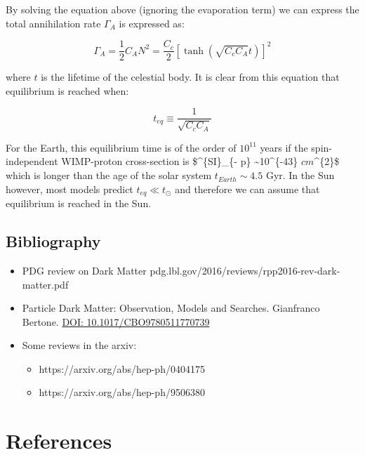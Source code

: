 \documentclass[
  letterpaper,
  DIV=11,
  numbers=noendperiod]{scrreprt}
\providecommand{\tightlist}{%
  \setlength{\itemsep}{0pt}\setlength{\parskip}{0pt}}\usepackage{longtable,booktabs,array}
\begin{document}
By solving the equation above (ignoring the evaporation term) we can
express the total annihilation rate \(\Gamma_A\) is expressed as:

\[\Gamma_A = \frac{1}{2}C_A N^2 = \frac{C_c}{2}\left[\tanh(\sqrt{C_c C_A} t)\right]^2\]

where \(t\) is the lifetime of the celestial body. It is clear from this
equation that equilibrium is reached when:

\[t_{eq} \equiv \frac{1}{\sqrt{C_c C_A}} \]

For the Earth, this equilibrium time is of the order of \(10^{11}\)
years if the spin-independent WIMP-proton cross-section is
\$\sigma\^{}\{SI\}\_\{\chi - p\} \sim 10\^{}\{-43\} \(cm\)\^{}\{2\}\$
which is longer than the age of the solar system \(t_{Earth} \sim 4.5\)
Gyr. In the Sun however, most models predict \(t_{eq} \ll t_\odot\) and
therefore we can assume that equilibrium is reached in the Sun.

\section{Bibliography}\label{bibliography}

\begin{itemize}
\tightlist
\item
  PDG review on Dark Matter
  pdg.lbl.gov/2016/reviews/rpp2016-rev-dark-matter.pdf
\item
  Particle Dark Matter: Observation, Models and Searches. Gianfranco
  Bertone.
  \href{https://www.cambridge.org/core/books/particle-dark-matter/B03C934EAB188884EFC6B02432632496}{DOI:
  10.1017/CBO9780511770739}
\item
  Some reviews in the arxiv:

  \begin{itemize}
  \tightlist
  \item
    https://arxiv.org/abs/hep-ph/0404175
  \item
    https://arxiv.org/abs/hep-ph/9506380
  \end{itemize}
\end{itemize}


\chapter*{References}\label{references-3}

\end{document}
